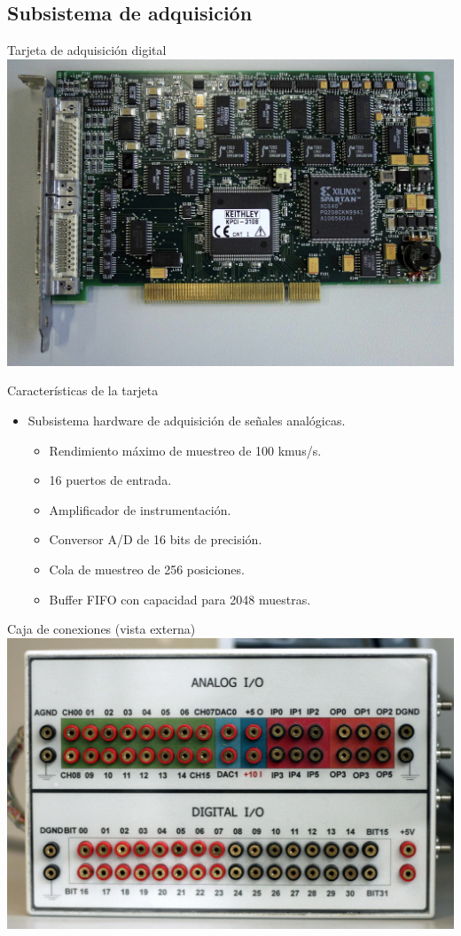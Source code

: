\documentclass[utf8, compress]			{beamer}
\begin{document}
\subsection{Subsistema de adquisición}

\begin{frame}{Tarjeta de adquisición digital}
    \includegraphics{tarjeta.jpg}
\end{frame}

\begin{frame}{Características de la tarjeta}
    \begin{itemize}
	\item Subsistema hardware de adquisición de señales analógicas.
	    \begin{itemize}
		\item Rendimiento máximo de muestreo de 100 kmus/s.
		\item 16 puertos de entrada.
		\item Amplificador de instrumentación.
		\item Conversor A/D de 16 bits de precisión.
		\item Cola de muestreo de 256 posiciones.
		\item Buffer FIFO con capacidad para 2048 muestras.
	    \end{itemize}
    \end{itemize}
\end{frame}

\begin{frame}{Caja de conexiones (vista externa)}
    \includegraphics{exterior.jpg}
\end{frame}
\end{document}
